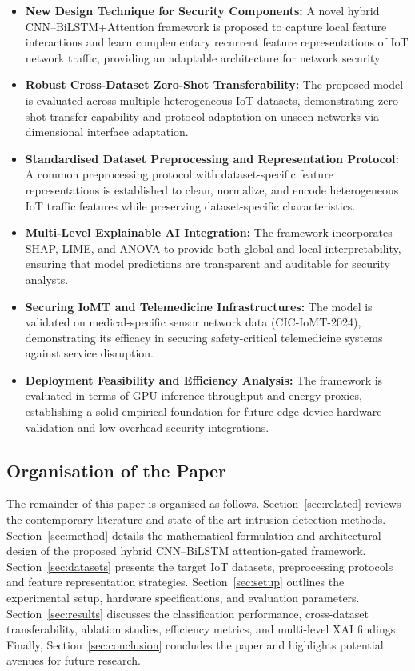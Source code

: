 \documentclass[a4paper,fleqn]{cas-sc}
\begin{document}
\begin{itemize}
    \item \textbf{New Design Technique for Security Components:} A novel hybrid CNN--BiLSTM+Attention framework is proposed to capture local feature interactions and learn complementary recurrent feature representations of IoT network traffic, providing an adaptable architecture for network security.

    \item \textbf{Robust Cross-Dataset Zero-Shot Transferability:} The proposed model is evaluated across multiple heterogeneous IoT datasets, demonstrating zero-shot transfer capability and protocol adaptation on unseen networks via dimensional interface adaptation.

    \item \textbf{Standardised Dataset Preprocessing and Representation Protocol:} A common preprocessing protocol with dataset-specific feature representations is established to clean, normalize, and encode heterogeneous IoT traffic features while preserving dataset-specific characteristics.

    \item \textbf{Multi-Level Explainable AI Integration:} The framework incorporates SHAP, LIME, and ANOVA to provide both global and local interpretability, ensuring that model predictions are transparent and auditable for security analysts.

    \item \textbf{Securing IoMT and Telemedicine Infrastructures:} The model is validated on medical-specific sensor network data (CIC-IoMT-2024), demonstrating its efficacy in securing safety-critical telemedicine systems against service disruption.

    \item \textbf{Deployment Feasibility and Efficiency Analysis:} The framework is evaluated in terms of GPU inference throughput and energy proxies, establishing a solid empirical foundation for future edge-device hardware validation and low-overhead security integrations.
\end{itemize}

\subsection{Organisation of the Paper}

The remainder of this paper is organised as follows.  Section~\ref{sec:related} reviews the contemporary literature and state-of-the-art intrusion detection methods. Section~\ref{sec:method} details the mathematical formulation and architectural design of the proposed hybrid CNN--BiLSTM attention-gated framework. Section~\ref{sec:datasets} presents the target IoT datasets, preprocessing protocols and feature representation strategies. Section~\ref{sec:setup} outlines the experimental setup, hardware specifications, and evaluation parameters. Section~\ref{sec:results} discusses the classification performance, cross-dataset transferability, ablation studies, efficiency metrics, and multi-level XAI findings. Finally, Section~\ref{sec:conclusion} concludes the paper and highlights potential avenues for future research. 
\end{document}
